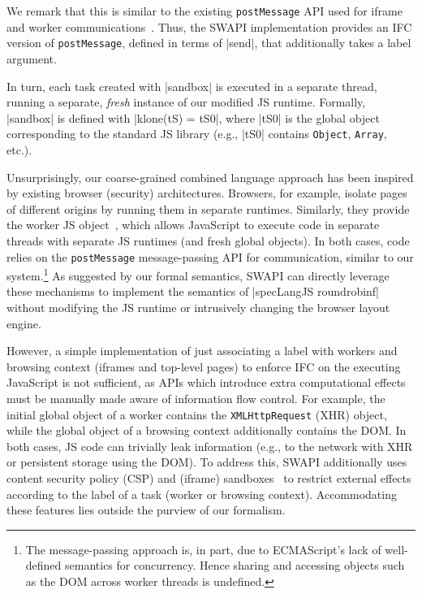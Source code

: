 
We remark that this is similar to the existing
\texttt{postMessage} API used for iframe and worker
communications~\cite{webworkers}.
%
Thus, the SWAPI implementation provides an IFC version of
\texttt{postMessage}, defined in terms of |send|, that additionally
takes a label argument.

%
In turn, each task created with |sandbox| is
executed in a separate thread, running a separate, \emph{fresh} instance of our
modified JS runtime.
%
Formally, |sandbox| is defined with |klone(tS) =
tS0|, where |tS0| is the global object corresponding to the standard
JS library (e.g., |tS0| contains \texttt{Object}, \texttt{Array},
etc.).



Unsurprisingly, our coarse-grained combined language approach has been
inspired by existing browser (security) architectures.
%
Browsers, for example, isolate pages of different origins by running
them in separate runtimes.
%
Similarly, they provide the worker JS object~\cite{webworkers}, which allows
JavaScript to execute code in separate threads with separate JS
runtimes (and fresh global objects).
%
In both cases, code relies on the \texttt{postMessage} message-passing
API for communication, similar to our system.\footnote{
  The message-passing approach is, in part, due to ECMAScript's lack
  of well-defined semantics for concurrency.
  Hence sharing and accessing objects such as the DOM across worker
  threads is undefined.
}
%
As suggested by our formal semantics, SWAPI can directly leverage these
mechanisms to implement the semantics of |specLangJS roundrobinf|
without modifying the JS runtime or intrusively changing the browser
layout engine.

However, a simple implementation of just associating a label with
workers and browsing context (iframes and top-level pages) to enforce
IFC on the executing JavaScript is not sufficient, as APIs which
introduce extra computational effects must be manually made aware of information flow
control.
%
For example, the initial global object of a worker contains the
\texttt{XMLHttpRequest} (XHR) object, while the global object of a
browsing context additionally contains the DOM.
%
In both cases, JS code can trivially leak information (e.g., to the
network with XHR or persistent storage using the DOM).
%
To address this, SWAPI additionally uses content security policy (CSP) and
(iframe) sandboxes~\cite{csp1.1,html5} to restrict external effects according
to the label of a task (worker or browsing context).  Accommodating these
features lies outside the purview of our formalism.

